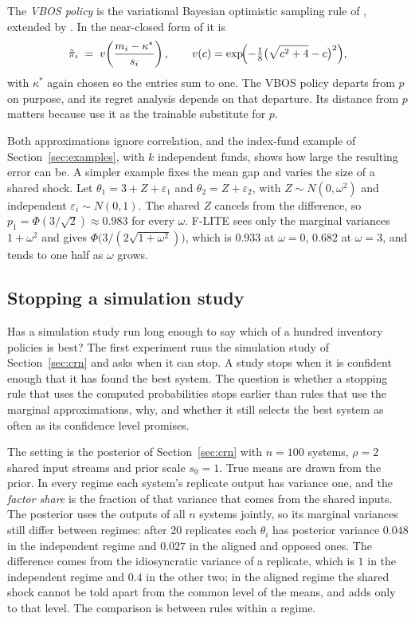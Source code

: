 \documentclass[11pt]{article}
\begin{document}
The \emph{VBOS policy} is the variational Bayesian optimistic sampling
rule of \citet{odonoghue2021}, extended by \citet{tarbouriech2023}. In
the near-closed form of \citet[Proposition~5, ``Fast VAPOR'']{menet2025} it is
\begin{equation}
\tilde{\pi}_i \;=\; v\!\left(\frac{m_i - \kappa^*}{s_i}\right),
\qquad v(c) = \exp\!\Bigl(-\tfrac{1}{8}\bigl(\sqrt{c^2 + 4} -
c\bigr)^2\Bigr),
\label{eq:vbos}
\end{equation}
with $\kappa^*$ again chosen so the entries sum to one. The VBOS
policy departs from $p$ on purpose, and its regret analysis depends
on that departure. Its distance from $p$ matters because
\citet{menet2026} use it as the trainable substitute for $p$.

Both approximations ignore correlation, and the index-fund example of
Section~\ref{sec:examples}, with $k$ independent funds, shows how
large the resulting error can be.
A simpler example fixes the mean gap and varies the size of a shared
shock. Let $\theta_1 = 3 + Z + \varepsilon_1$ and
$\theta_2 = Z + \varepsilon_2$, with $Z \sim N(0, \omega^2)$ and
independent $\varepsilon_i \sim N(0, 1)$. The shared $Z$ cancels from
the difference, so $p_1 = \Phi(3/\sqrt{2}) \approx 0.983$ for every
$\omega$. F-LITE sees only the marginal variances $1 + \omega^2$ and gives
$\Phi\bigl(3 / (2\sqrt{1 + \omega^2})\bigr)$, which is $0.933$ at
$\omega = 0$, $0.682$ at $\omega = 3$, and tends to one half as $\omega$
grows.

\subsection{Stopping a simulation study}
\label{sec:stopping}

Has a simulation study run long enough to say which of a hundred
inventory policies is best? The first experiment runs the simulation study of
Section~\ref{sec:crn} and asks when it can stop. A study stops when
it is confident enough that it has found the best system. The
question is whether a stopping rule that uses the computed
probabilities stops earlier than rules that use the marginal
approximations, why, and whether it still selects the best system as often
as its confidence level promises.

The setting is the posterior of Section~\ref{sec:crn} with $n = 100$
systems, $\rho = 2$ shared input streams and prior scale $s_0 = 1$.
True means are drawn from the prior. In every regime each system's
replicate output has variance one, and the \emph{factor share} is the
fraction of that variance that comes from the shared inputs. The
posterior uses the outputs of all $n$ systems jointly, so its
marginal variances still differ between regimes: after 20 replicates each $\theta_i$ has
posterior variance $0.048$ in the independent regime and $0.027$ in
the aligned and opposed ones. The difference comes from the
idiosyncratic variance of a replicate, which is $1$ in the independent
regime and $0.4$ in the other two; in the aligned regime the shared
shock cannot be told apart from the common level of the means, and
adds only to that level. The comparison is between rules within a regime.
\end{document}
